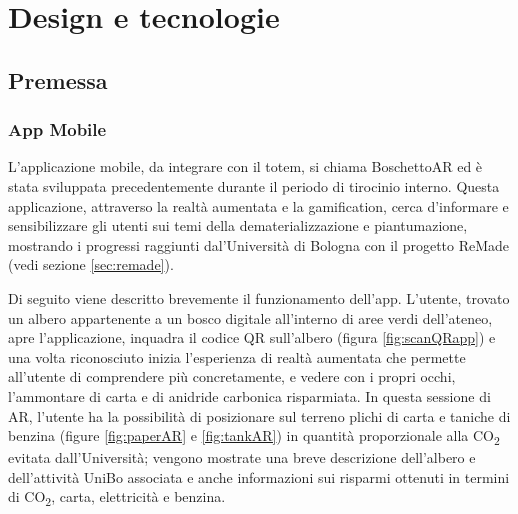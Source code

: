 \chapter{Design e tecnologie}
\section{Premessa}
\subsection{App Mobile}
L'applicazione mobile, da integrare con il totem, si chiama BoschettoAR \cite{repoBoschettoAR} ed è stata sviluppata precedentemente durante il periodo di tirocinio interno. Questa applicazione, attraverso la realtà aumentata e la gamification, cerca d'informare e sensibilizzare gli utenti sui temi della dematerializzazione e piantumazione, mostrando i progressi raggiunti dal'Università di Bologna con il progetto ReMade (vedi sezione \ref{sec:remade}).

Di seguito viene descritto brevemente il funzionamento dell'app.
L'utente, trovato un albero appartenente a un bosco digitale all'interno di aree verdi dell'ateneo, apre l'applicazione, inquadra il codice QR sull'albero (figura \ref{fig:scanQRapp}) e una volta riconosciuto inizia l'esperienza di realtà aumentata che permette all'utente di comprendere più concretamente, e vedere con i propri occhi, l'ammontare di carta e di anidride carbonica risparmiata. In questa sessione di AR, l'utente ha la possibilità di posizionare sul terreno plichi di carta e taniche di benzina (figure \ref{fig:paperAR} e \ref{fig:tankAR}) in quantità proporzionale alla CO\textsubscript{2} evitata dall'Università; vengono mostrate una breve descrizione dell'albero e dell'attività UniBo associata e anche informazioni sui risparmi ottenuti in termini di CO\textsubscript{2}, carta, elettricità e benzina.

